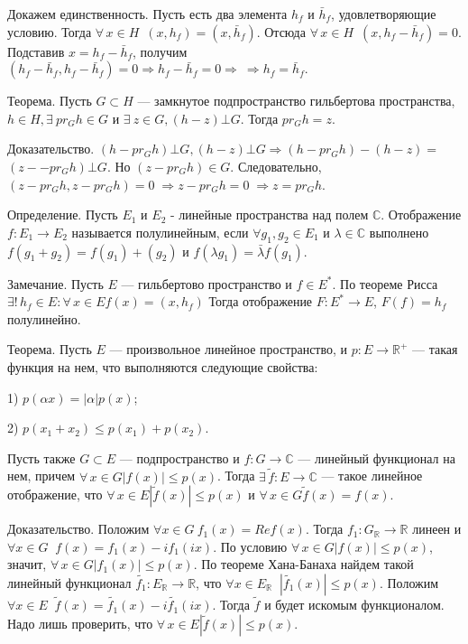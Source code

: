 \documentclass[12pt,titlepage, a4paper]{article}
\begin{document}
Докажем единственность. Пусть есть два элемента $h_f$ и
$\bar{h}_f$, удовлетворяющие условию. Тогда $\forall\,x\in H$\
$(x,h_f)=(x,\bar{h}_f)$. Отсюда $\forall\,x\in H$\
$(x,h_f-\bar{h}_f)=0$. Подставив $x=h_f-\bar{h}_f$, получим
$(h_f-\bar{h}_f,h_f-\bar{h}_f)=0\Rightarrow
h_f-\bar{h}_f=0\Rightarrow \ \Rightarrow h_f=\bar{h}_f.$

\; Теорема. Пусть $G\subset H$ --- замкнутое подпространство
гильбертова пространства, $h\in H, \exists\ pr_{G}h\in G $ и
$\exists\ z\in G, (h-z)\bot G$. Тогда $pr_{G}h=z$.\;

Доказательство. $(h-pr_{G}h)\bot G, (h-z)\bot G \Rightarrow
(h-pr_{G}h)-(h-z)=$$(z--pr_{G}h)\bot G$. Но $(z-pr_{G}h)\in G$.
Следовательно, $(z-pr_{G}h,z-pr_{G}h)=0\;$$ \Rightarrow
z-pr_{G}h=0\;$$\Rightarrow z=pr_{G}h$.

Определение. Пусть $E_1$ и $E_2$ - линейные пространства над полем
$\mathbb{C}$. Отображение $f:E_1\rightarrow E_2$ называется
полулинейным, если $\forall g_1, g_2\in E_1$ и $\lambda \in
\mathbb{C}$ выполнено $f(g_1+g_2)=f(g_1)+(g_2)$ и $f(\lambda
g_1)=\bar{\lambda} f(g_1)$.

Замечание. Пусть $E$ --- гильбертово пространство и $f\in E^*$. По
теореме Рисса  $\exists!\,h_f\in E:\forall\,x\in
E$\;\;$f(x)=(x,h_f)$ Тогда отображение $F\colon E^*\rightarrow E$,
$F(f)=h_f$ полулинейно.

Теорема.  Пусть $E$ --- произвольное линейное пространство, и
$p\colon E\to\mathbb{R}^+$
--- такая функция на нем, что выполняются следующие свойства:

1) $p(\alpha x)=|\alpha| p(x)$;

2) $p(x_1+x_2)\leqslant p(x_1)+p(x_2)$.

Пусть также $G\subset E$ --- подпространство и $f\colon
G\to\mathbb{C}$ --- линейный функционал на нем, причем
$\forall\,x\in G$\;\;$|f(x)|\leqslant p(x)$. Тогда
$\exists\,\tilde{f}\colon E\to \mathbb{C}$ --- такое линейное
отображение, что $\forall\,x\in E$\;\;$|\tilde{f}(x)|\leqslant
p(x)$ и $\forall\,x\in G$\;\;$\tilde{f}(x)=f(x)$.

Доказательство. Положим $\forall x\in G\ f_1(x)=Re f(x)$. Тогда
$f_1\colon G_{\mathbb{R}}\rightarrow \mathbb{R}$ линеен и $\forall
x \in G\;\; f(x)=f_1(x)-if_1(ix)$. По условию $\forall\,x\in
G$\;\;$|f(x)|\leqslant p(x)$, значит, $\forall\,x\in
G$\;\;$|f_1(x)|\leqslant p(x)$. По теореме Хана-Банаха найдем
такой линейный функционал $\tilde{f_1}\colon
E_{\mathbb{R}}\rightarrow \mathbb{R}$, что $\forall x\in
E_{\mathbb{R}} \;\;|\tilde{f_1}(x)|\leqslant p(x)$. Положим
$\forall x \in E\;\;
\tilde{f}(x)=\tilde{f_1}(x)-i\tilde{f_1}(ix)$. Тогда $\tilde{f}$ и
будет искомым функционалом. Надо лишь проверить, что
$\forall\,x\in E$\;\;$|\tilde{f}(x)|\leqslant p(x)$.
\end{document}
